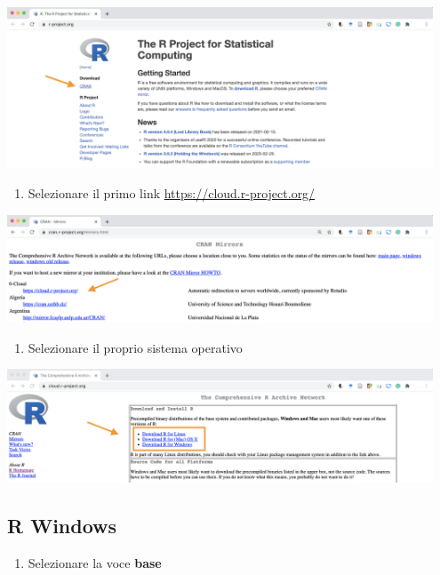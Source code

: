 \documentclass[
]{book}
\providecommand{\tightlist}{%
  \setlength{\itemsep}{0pt}\setlength{\parskip}{0pt}}
\begin{document}
\includegraphics[width=0.95\textwidth,height=\textheight]{images/install_CRAN.png}

\begin{enumerate}
\def\labelenumi{\arabic{enumi}.}
\setcounter{enumi}{2}
\tightlist
\item
  Selezionare il primo link \url{https://cloud.r-project.org/}
\end{enumerate}

\includegraphics[width=0.95\textwidth,height=\textheight]{images/install_mirror.png}

\begin{enumerate}
\def\labelenumi{\arabic{enumi}.}
\setcounter{enumi}{3}
\tightlist
\item
  Selezionare il proprio sistema operativo
\end{enumerate}

\includegraphics[width=0.95\textwidth,height=\textheight]{images/install_OS.png}

\hypertarget{r-windows}{%
\subsection{R Windows}\label{r-windows}}

\begin{enumerate}
\def\labelenumi{\arabic{enumi}.}
\tightlist
\item
  Selezionare la voce \textbf{base}
\end{enumerate}
\end{document}
